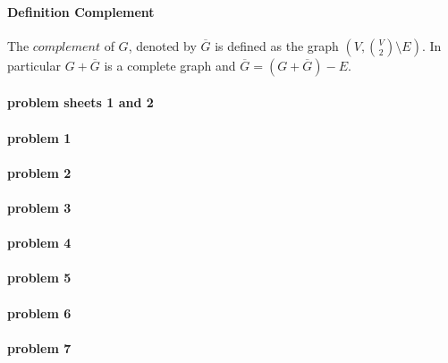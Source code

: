 \paragraph{Definition Complement}
The $ complement $ of $ G $, denoted by $ \overline{G} $ is defined as the graph
$ (V,\binom{V}{2} \setminus E)$. In particular $ G + \overline{G} $ is a 
complete graph and $ \overline{G} = (G + \overline{G}) - E $. 


\paragraph{problem sheets 1 and 2}

\paragraph{problem 1}

\paragraph{problem 2}

\paragraph{problem 3}

\paragraph{problem 4}

\paragraph{problem 5}

\paragraph{problem 6}

\paragraph{problem 7}